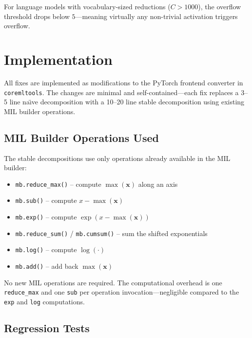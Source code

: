 \documentclass[10pt,twocolumn]{article}
\newcommand{\coremltools}{\texttt{coremltools}}
\begin{document}
For language models with vocabulary-sized reductions ($C > 1000$),
the overflow threshold drops below $5$---meaning virtually any
non-trivial activation triggers overflow.


\section{Implementation}
\label{sec:implementation}

All fixes are implemented as modifications to the PyTorch frontend
converter in \coremltools{}.  The changes are minimal and
self-contained---each fix replaces a 3--5 line na\"{\i}ve
decomposition with a 10--20 line stable decomposition using
existing MIL builder operations.

\subsection{MIL Builder Operations Used}

The stable decompositions use only operations already available in
the MIL builder:

\begin{itemize}[leftmargin=*,itemsep=1pt]
  \item \texttt{mb.reduce\_max()} -- compute $\max(\mathbf{x})$
    along an axis
  \item \texttt{mb.sub()} -- compute $x - \max(\mathbf{x})$
  \item \texttt{mb.exp()} -- compute $\exp(x - \max(\mathbf{x}))$
  \item \texttt{mb.reduce\_sum()} / \texttt{mb.cumsum()} -- sum
    the shifted exponentials
  \item \texttt{mb.log()} -- compute $\log(\cdot)$
  \item \texttt{mb.add()} -- add back $\max(\mathbf{x})$
\end{itemize}

No new MIL operations are required.  The computational overhead is
one \texttt{reduce\_max} and one \texttt{sub} per operation
invocation---negligible compared to the \texttt{exp} and
\texttt{log} computations.

\subsection{Regression Tests}
\end{document}
